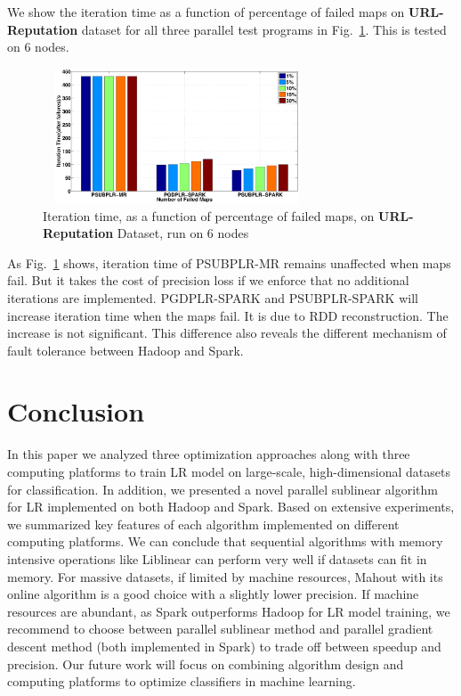 \documentclass[10pt, conference, compsocconf]{IEEEtran}
\begin{document}
We show the iteration time as a function of percentage of failed maps on \textbf{URL-Reputation} dataset for all three parallel test programs in Fig.~\ref{fig:14}.
This is tested on 6 nodes.
\begin{figure}[tb]
\center \includegraphics[height=4cm,width=8cm]{img/fault_tolerance.eps}\vspace{-0.3cm}
\caption{Iteration time, as a function of percentage of failed maps, on \textbf{URL-Reputation} Dataset, run on 6 nodes}\label{fig:14}\vspace{-0.5cm}
\end{figure}
As Fig.~\ref{fig:14} shows, iteration time of PSUBPLR-MR remains unaffected when maps fail. But it takes the cost of precision loss if we enforce that no additional iterations are implemented.
PGDPLR-SPARK and PSUBPLR-SPARK will increase iteration time when the maps fail. It is due to RDD reconstruction. The increase is not significant.
This difference also reveals the different mechanism of fault tolerance between Hadoop and Spark.

\section{Conclusion} \label{sec:concl}
In this paper we analyzed three optimization approaches along with three computing platforms to train LR model on large-scale, high-dimensional datasets for classification. In addition, we presented a novel parallel sublinear algorithm for LR implemented on both Hadoop and Spark. Based on extensive experiments, we summarized key features of each algorithm implemented on different computing platforms.
We can conclude that sequential algorithms with memory intensive operations like Liblinear can perform very well if datasets can fit in memory.
For massive datasets, if limited by machine resources, Mahout with its online algorithm is a good choice with a slightly lower precision.
If machine resources are abundant, as Spark outperforms Hadoop for LR model training, we recommend to choose between parallel sublinear method and parallel gradient descent method (both implemented in Spark) to trade off between speedup and precision.
Our future work will focus on combining algorithm design and computing platforms to optimize classifiers in machine learning.

\begin{small}


\end{small}
\end{document}
